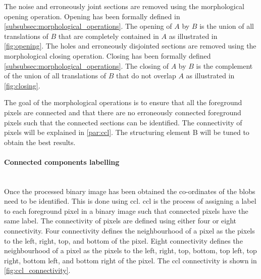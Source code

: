 The noise and erroneously joint sections are removed using the morphological opening operation. Opening has been formally defined in \autoref{subsubsec:morphological_operations}. The opening of $A$ by $B$ is the union of all translations of $B$ that are completely contained in $A$ as illustrated in \autoref{fig:opening}. The holes and erroneously disjointed sections are removed using the morphological closing operation. Closing has been formally defined \autoref{subsubsec:morphological_operations}. The closing of $A$ by $B$ is the complement of the union of all translations of $B$ that do not overlap $A$ as illustrated in \autoref{fig:closing}.

The goal of the morphological operations is to ensure that all the foreground pixels are connected and that there are no erroneously connected foreground pixels such that the connected sections can be identified. The connectivity of pixels will be explained in \autoref{par:ccl}. The structuring element B will be tuned to obtain the best results.

\paragraph{Connected components labelling}\label{par:ccl}\mbox{}\\
Once the processed binary image has been obtained the co-ordinates of the blobs need to be identified. This is done using \gls{ccl}. \Gls{ccl} is the process of assigning a label to each foreground pixel in a binary image such that connected pixels have the same label. The connectivity of pixels are defined using either four or eight connectivity. Four connectivity defines the neighbourhood of a pixel as the pixels to the left, right, top, and bottom of the pixel. Eight connectivity defines the neighbourhood of a pixel as the pixels to the left, right, top, bottom, top left, top right, bottom left, and bottom right of the pixel. The \gls{ccl} connectivity is shown in \autoref{fig:ccl_connectivity}.


